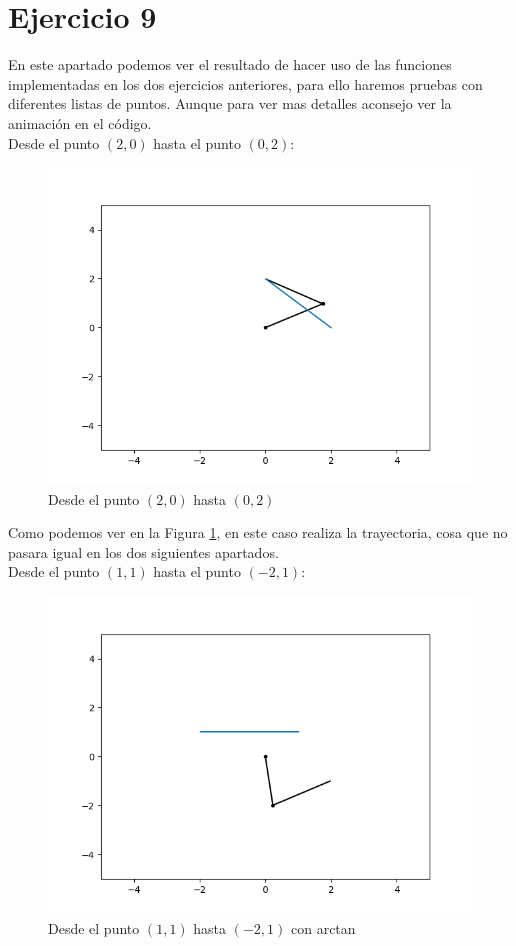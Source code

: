 \documentclass[12pt,a4paper]{report}
\begin{document}
\section*{Ejercicio  9}
En este apartado podemos ver el resultado de hacer uso de las funciones implementadas en los dos ejercicios anteriores, para ello haremos pruebas con diferentes listas de puntos. Aunque para ver mas detalles aconsejo ver la animación en el código. \\
Desde el punto $(2,0)$ hasta el punto $(0,2)$:
\begin{figure}[H]
	\centering
	\includegraphics[width=0.7\linewidth]{img/Primer_apartado-Eje_9.png}
	\caption{Desde el punto $(2,0)$ hasta $(0,2)$}
	\label{fig:ej9-a}
\end{figure}
Como podemos ver en la Figura \ref{fig:ej9-a}, en este caso realiza la trayectoria, cosa que no pasara igual en los dos siguientes apartados.\\
Desde el punto $(1,1)$ hasta el punto $(-2,1)$:
\begin{figure}[H]
	\centering
	\includegraphics[width=0.7\linewidth]{img/Segundo__apartado-Eje_9.png}
	\caption{Desde el punto $(1,1)$ hasta $(-2,1)$  con arctan}
	\label{fig:ej9-b}
\end{figure}
\end{document}
